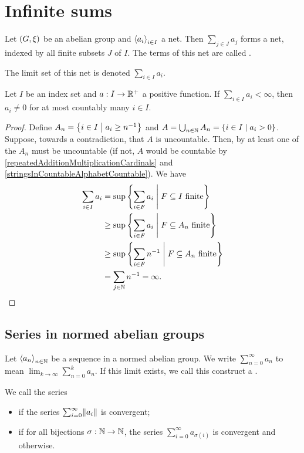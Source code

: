 \section{Infinite sums}
\begin{definition}
Let $\sSet{G,\xi}$ be an abelian group and $\left\langle a_i \right\rangle_{i\in I}$ a net. Then $\sum_{j\in J}a_j$ forms a net, indexed by all finite subsets $J$ of $I$. The terms of this net are called .

The limit set of this net is denoted $\sum_{i\in I} a_i$.
\end{definition}

\begin{proposition} \label{finiteSumsAreCountable}
Let $I$ be an index set and $a: I\to \mathbb{R}^+$ a positive function. If $\sum_{i\in I}a_i < \infty$, then $a_i\neq 0$ for at most countably many $i\in I$.
\end{proposition}
\begin{proof}
Define $A_n = \setbuilder{i\in I}{a_i \geq n^{-1}}$ and $A = \bigcup_{n\in \N}A_n = \setbuilder{i\in I}{a_i > 0}$. Suppose, towards a contradiction, that $A$ is uncountable. Then, by at least one of the $A_n$ must be uncountable (if not, $A$ would be countable by \ref{repeatedAdditionMultiplicationCardinals} and \ref{stringsInCountableAlphabetCountable}). We have
\begin{align*}
\sum_{i\in I}a_i &= \sup\setbuilder{\sum_{i\in F}a_i}{\text{$F\subseteq I$ finite}} \\
&\geq \sup\setbuilder{\sum_{i\in F}a_i}{\text{$F\subseteq A_n$ finite}} \\
&\geq \sup\setbuilder{\sum_{i\in F}n^{-1}}{\text{$F\subseteq A_n$ finite}} \\
&= \sum_{j\in \N}n^{-1} = \infty.
\end{align*}
\end{proof}

\subsection{Series in normed abelian groups}
\begin{definition}
Let $\left\langle a_n \right\rangle_{n\in \mathbb{N}}$ be a sequence in a normed abelian group. We write $\sum_{n=0}^\infty a_n$ to mean $\lim_{k\to \infty} \sum_{n=0}^k a_n$. If this limit exists, we call this construct a .

We call the series
\begin{itemize}
\item {} if the series $\sum_{i=0}^\infty \lVert a_i\rVert$ is convergent;
\item {} if for all bijections $\sigma: \mathbb{N}\to \mathbb{N}$, the series $\sum_{i=0}^\infty a_{\sigma(i)}$ is convergent and  otherwise.
\end{itemize}
\end{definition}

